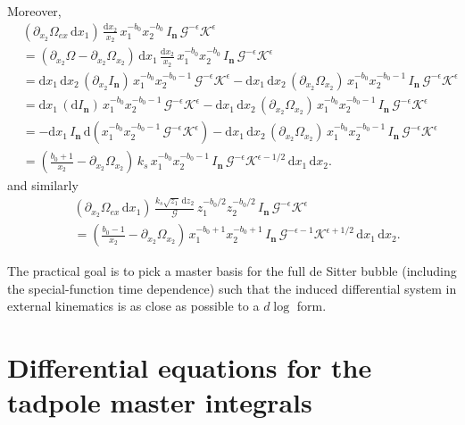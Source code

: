 \documentclass[a4paper,12pt]{article}
\newcommand{\n}{\nonumber}
\def\di{{\mathrm{d}}}
\def\ep{\epsilon}
\newcommand{\mG}{\mathcal{G}}
\newcommand{\mK}{\mathcal{K}}
\begin{document}
Moreover,
\begin{align*}
	&(\partial_{x_2}\Omega_{ex}\,\di x_1)\,\frac{\di x_2}{x_2}\,x_1^{-b_0}x_2^{-b_0}\,I_{\bm n}\,\mG^{-\ep}\mK^{\ep} \n\\
	&= (\partial_{x_2}\Omega-\partial_{x_2}\Omega_{x_2})\,\di x_1\,\frac{\di x_2}{x_2}\,x_1^{-b_0}x_2^{-b_0}\,I_{\bm n}\,\mG^{-\ep}\mK^{\ep} \n\\
	&= \di x_1\,\di x_2\,(\partial_{x_2}I_{\bm n})\,x_1^{-b_0}x_2^{-b_0-1}\,\mG^{-\ep}\mK^{\ep} 
	- \di x_1\,\di x_2\,(\partial_{x_2}\Omega_{x_2})\,x_1^{-b_0}x_2^{-b_0-1}\,I_{\bm n}\,\mG^{-\ep}\mK^{\ep} \n\\
	&= \di x_1\,(\di I_{\bm n})\,x_1^{-b_0}x_2^{-b_0-1}\,\mG^{-\ep}\mK^{\ep} 
	- \di x_1\,\di x_2\,(\partial_{x_2}\Omega_{x_2})\,x_1^{-b_0}x_2^{-b_0-1}\,I_{\bm n}\,\mG^{-\ep}\mK^{\ep} \n\\
	&= -\di x_1\,I_{\bm n}\,\di\!\left( x_1^{-b_0}x_2^{-b_0-1}\,\mG^{-\ep}\mK^{\ep} \right) 
	- \di x_1\,\di x_2\,(\partial_{x_2}\Omega_{x_2})\,x_1^{-b_0}x_2^{-b_0-1}\,I_{\bm n}\,\mG^{-\ep}\mK^{\ep} \n\\
	&= \left(\frac{b_0+1}{x_2}-\partial_{x_2}\Omega_{x_2}\right)\,k_s\,x_1^{-b_0}x_2^{-b_0-1}\,I_{\bm n}\,\mG^{-\ep}\mK^{\ep-1/2}\,\di x_1\,\di x_2.
\end{align*}
and similarly
\begin{align*}
	&(\partial_{x_2}\Omega_{ex}\,\di x_1)\,\frac{k_s\sqrt{z_1}\,\di z_2}{\mG}\,z_1^{-b_0/2}z_2^{-b_0/2}\,I_{\bm n}\,\mG^{-\ep}\mK^{\ep} \n\\
	&= \left(\frac{b_0-1}{x_2}-\partial_{x_2}\Omega_{x_2}\right)\,x_1^{-b_0+1}x_2^{-b_0+1}\,I_{\bm n}\,\mG^{-\ep-1}\mK^{\ep+1/2}\,\di x_1\,\di x_2.
\end{align*}

The practical goal is to pick a master basis for the full de Sitter bubble (including the special-function time dependence) such that the induced differential system in external kinematics is as close as possible to a $d\log$ form.

\section{Differential equations for the tadpole master integrals}
\label{sec:deR1}
\end{document}
